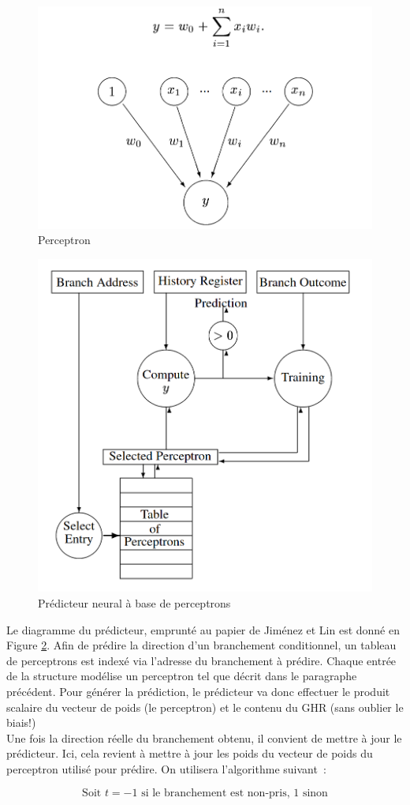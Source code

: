 \documentclass[a4paper]{article}
\begin{document}
\begin{figure}[hbt]\center\leavevmode
	\includegraphics[width=0.5\linewidth]{1perceptron}
	\caption{Perceptron}
	\label{1perceptron}
\end{figure}

      \begin{figure}[hbt]\center\leavevmode
	\includegraphics[width=0.5\linewidth]{perceptron}
	\caption{Prédicteur neural à base de perceptrons}
	\label{perceptron}
\end{figure}

Le diagramme du prédicteur, emprunté au papier de Jiménez et Lin est donné en Figure \ref{perceptron}. Afin de prédire la direction d'un branchement conditionnel, un tableau de perceptrons est indexé via l'adresse du branchement à prédire. Chaque entrée de la structure modélise un perceptron tel que décrit dans le paragraphe précédent. Pour générer la prédiction, le prédicteur va donc effectuer le produit scalaire du vecteur de poids (le perceptron) et le contenu du GHR (sans oublier le biais!) \\

Une fois la direction réelle du branchement obtenu, il convient de mettre à jour le prédicteur. Ici, cela revient à mettre à jour les poids du vecteur de poids du perceptron utilisé pour prédire. On utilisera l'algorithme suivant~:

\begin{equation*}
\text{Soit~} t = -1 \text{~si le branchement est non-pris, 1 sinon}
\end{equation*}
\end{document}
